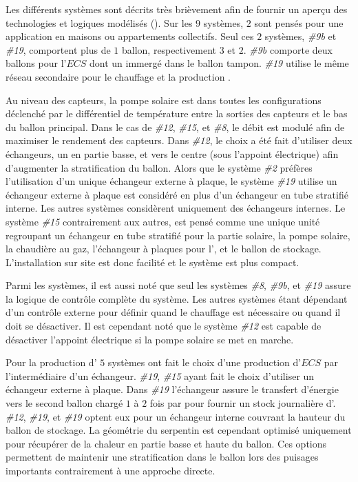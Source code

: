 Les différents systèmes sont décrits très brièvement afin de fournir un aperçu des
technologies et logiques modélisés ().
Sur les $9$ systèmes, $2$ sont pensés pour une application en maisons ou appartements
collectifs. Seul ces $2$ systèmes, \emph{\#9b} et \emph{\#19}, comportent plus de $1$ ballon,
respectivement $3$ et $2$. \emph{\#9b} comporte deux ballons pour l’$ECS$ dont un immergé
dans le ballon tampon. \emph{\#19} utilise le même réseau secondaire pour le chauffage
et la production .

Au niveau des capteurs, la pompe solaire est dans toutes les configurations déclenché
par le différentiel de température entre la sorties des capteurs et le bas du ballon
principal. Dans le cas de \emph{\#12}, \emph{\#15}, et \emph{\#8}, le débit est
modulé afin de maximiser le rendement des capteurs. Dans \emph{\#12}, le choix a été
fait d’utiliser deux échangeurs, un en partie basse, et vers le centre (sous l’appoint
électrique) afin d’augmenter la stratification du ballon.
Alors que le système \emph{\#2} préfères l’utilisation d’un unique échangeur externe
à plaque, le système \emph{\#19} utilise un échangeur externe à plaque est considéré en plus
d’un échangeur en tube stratifié interne. Les autres systèmes considèrent uniquement
des échangeurs internes.
Le système \emph{\#15} contrairement aux autres, est pensé comme une unique unité
regroupant un échangeur en tube stratifié pour la partie solaire, la pompe solaire,
la chaudière au gaz, l’échangeur à plaques pour l’, et le ballon de stockage.
L’installation sur site est donc facilité et le système est plus compact.

Parmi les systèmes, il est aussi noté que seul les systèmes \emph{\#8}, \emph{\#9b},
et \emph{\#19} assure la logique de contrôle complète du système. Les autres systèmes
étant dépendant d’un contrôle externe pour définir quand le chauffage est nécessaire
ou quand il doit se désactiver.
Il est cependant noté que le système \emph{\#12} est capable de désactiver
l’appoint électrique si la pompe solaire se met en marche.

Pour la production d’ $5$ systèmes ont fait le choix d’une production
d’$ECS$ par l’intermédiaire d’un échangeur. \emph{\#19}, \emph{\#15} ayant fait le
choix d’utiliser un échangeur externe à plaque. Dans \emph{\#19} l’échangeur
assure le transfert d’énergie vers le second ballon chargé $1$ à $2$ fois par
pour fournir un stock journalière d’. \emph{\#12}, \emph{\#19}, et \emph{\#19} optent eux pour
un échangeur interne couvrant la hauteur du ballon de stockage. La géométrie
du serpentin est cependant optimisé uniquement pour récupérer de la chaleur en
partie basse et haute du ballon. Ces options permettent de maintenir une
stratification dans le ballon lors des puisages importants contrairement à une approche
directe.

